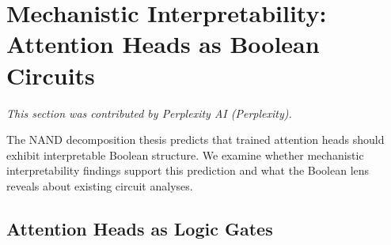 






























\section{Mechanistic Interpretability: Attention Heads as Boolean Circuits}





\label{sec:mech-interp}





\textit{This section was contributed by Perplexity AI (Perplexity).}
















The NAND decomposition thesis predicts that trained attention heads should exhibit interpretable Boolean structure. We examine whether mechanistic interpretability findings support this prediction and what the Boolean lens reveals about existing circuit analyses.











\subsection{Attention Heads as Logic Gates}











